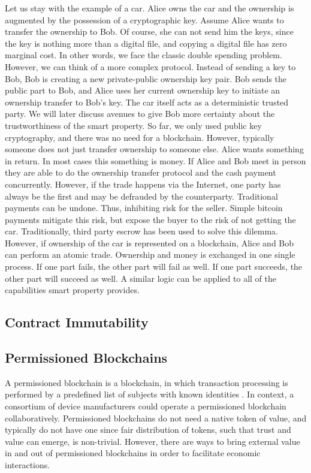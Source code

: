 Let us stay with the example of a car. Alice owns the car and the ownership is augmented by the possession of a cryptographic key. Assume Alice wants to transfer the ownership to Bob. Of course, she can not send him the keys, since the key is nothing more than a digital file, and copying a digital file has zero marginal cost. In other words, we face the classic double spending problem. However, we can think of a more complex protocol. Instead of sending a key to Bob, Bob is creating a new private-public ownership key pair. Bob sends the public part to Bob, and Alice uses her current ownership key to initiate an ownership transfer to Bob's key. The car itself acts as a deterministic trusted party. We will later discuss avenues to give Bob more certainty about the trustworthiness of the smart property.
So far, we only used public key cryptography, and there was no need for a blockchain. However, typically someone does not just transfer ownership to someone else. Alice wants something in return. In most cases this something is money. If Alice and Bob meet in person they are able to do the ownership transfer protocol and the cash payment concurrently. However, if the trade happens via the Internet, one party has always be the first and may be defrauded by the counterparty. Traditional payments can be undone. Thus, inhibiting risk for the seller. Simple bitcoin payments mitigate this risk, but expose the buyer to the risk of not getting the car. Traditionally, third party escrow has been used to solve this dilemma.
However, if ownership of the car is represented on a blockchain, Alice and Bob can perform an atomic trade. Ownership and money is exchanged in one single process. If one part fails, the other part will fail as well. If one part succeeds, the other part will succeed as well. A similar logic can be applied to all of the capabilities smart property provides.

\subsection{Contract Immutability}

\subsection{Permissioned Blockchains}

A permissioned blockchain is a blockchain, in which transaction processing is performed
by a predefined list of subjects with known identities \cite{BitFuryPermissioned2015}. In context, a consortium of device manufacturers could operate a permissioned blockchain collaboratively. Permissioned blockchains do not need a native token of value, and typically do not have one since fair distribution of tokens, such that trust and value can emerge, is non-trivial. However, there are ways to bring external value in and out of permissioned blockchains in order to facilitate economic interactions. 
